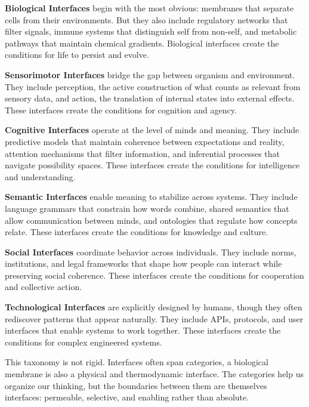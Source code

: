 \documentclass[
  openright]{book}
\begin{document}
\textbf{Biological Interfaces} begin with
the most obvious: membranes that separate cells from their environments.
But they also include regulatory networks that filter signals, immune
systems that distinguish self from non-self, and metabolic pathways that
maintain chemical gradients. Biological interfaces create the conditions
for life to persist and evolve.

\textbf{Sensorimotor Interfaces} bridge
the gap between organism and environment. They include
perception, the active construction of what counts as
relevant from sensory data, and action, the translation of
internal states into external effects. These interfaces create the
conditions for cognition and agency.

\textbf{Cognitive Interfaces} operate at the
level of minds and meaning. They include predictive
models that maintain coherence between expectations and
reality, attention mechanisms that filter
information, and inferential processes that navigate
possibility spaces. These interfaces create the conditions for
intelligence and understanding.

\textbf{Semantic Interfaces} enable
meaning to stabilize across systems. They include
language grammars that constrain how words combine, shared semantics
that allow communication between minds, and ontologies
that regulate how concepts relate. These interfaces create the
conditions for knowledge and culture.

\textbf{Social Interfaces} coordinate behavior
across individuals. They include norms, institutions, and legal
frameworks that shape how people can interact while preserving social
coherence. These interfaces create the conditions for
cooperation and collective action.

\textbf{Technological Interfaces} are
explicitly designed by humans, though they often rediscover patterns
that appear naturally. They include
APIs, protocols, and
user interfaces that enable systems to work together. These interfaces
create the conditions for complex engineered systems.

This taxonomy is not rigid. Interfaces often span categories, a
biological membrane is also a physical and thermodynamic interface. The
categories help us organize our thinking, but the boundaries between
them are themselves interfaces: permeable, selective, and enabling
rather than absolute.
\end{document}
